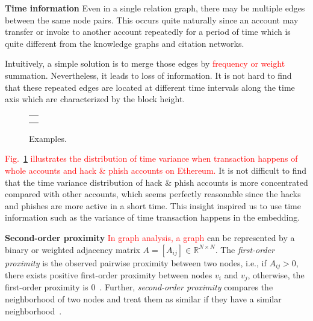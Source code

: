 \textbf{Time information} Even in a single relation graph, there may be multiple edges between the same node pairs. This occurs quite naturally since an account may transfer or invoke to another account repeatedly for a period of time which is quite different from the knowledge graphs and citation networks.

Intuitively, a simple solution is to merge those edges by \textcolor{red}{frequency or weight} summation. Nevertheless, it leads to loss of information. It is not hard to find that these repeated edges are located at different time intervals along the time axis which are characterized by the block height.

\begin{figure}[htbp]
\centering
\begin{tabular}{c}
	\subfigure[Time variance histogram of whole nodes.]{
		\label{fig:high_order}
    
	}\\
	\subfigure[Time variance histogram of hack\&phish nodes.]{
		\label{fig:asymmetric}
    
	}
\end{tabular}
\caption{Examples.}
\label{fig:time_std}
\end{figure}

\textcolor{red}{Fig.~\ref{fig:time_std} illustrates the distribution of time variance when transaction happens of whole accounts and hack \& phish accounts on Ethereum.} It is not difficult to find that the time variance distribution of hack \& phish accounts is more concentrated compared with other accounts, which seems perfectly reasonable since the hacks and phishes are more active in a short time. This insight inspired us to use time information such as the variance of time transaction happens in the embedding.

\textbf{Second-order proximity} \textcolor{red}{In graph analysis, a graph} can be represented by a binary or weighted adjacency matrix $A=[A_{ij}]\in \mathbb{R}^{N\times N}$. The \emph{first-order proximity} is the observed pairwise proximity between two nodes, i.e., if $A_{ij}>0$, there exists positive first-order proximity between nodes $v_i$ and $v_j$, otherwise, the first-order proximity is $0$~\cite{tang2015line}. Further, \emph{second-order proximity} compares the neighborhood of two nodes and treat them as similar if they have a similar neighborhood~\cite{goyal2018graph}.


